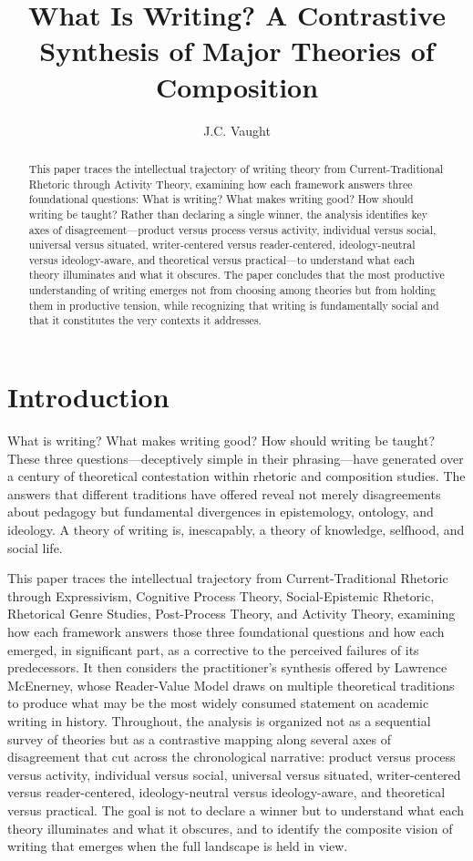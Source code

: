 \documentclass[12pt]{article}
\author{J.C. Vaught}
\title{What Is Writing? A Contrastive Synthesis of Major Theories of Composition}
\date{}
\begin{document}
\maketitle

\begin{abstract}
This paper traces the intellectual trajectory of writing theory from Current-Traditional Rhetoric through Activity Theory, examining how each framework answers three foundational questions: What is writing? What makes writing good? How should writing be taught? Rather than declaring a single winner, the analysis identifies key axes of disagreement---product versus process versus activity, individual versus social, universal versus situated, writer-centered versus reader-centered, ideology-neutral versus ideology-aware, and theoretical versus practical---to understand what each theory illuminates and what it obscures. The paper concludes that the most productive understanding of writing emerges not from choosing among theories but from holding them in productive tension, while recognizing that writing is fundamentally social and that it constitutes the very contexts it addresses.
\end{abstract}

\section{Introduction}

What is writing? What makes writing good? How should writing be taught? These three questions---deceptively simple in their phrasing---have generated over a century of theoretical contestation within rhetoric and composition studies. The answers that different traditions have offered reveal not merely disagreements about pedagogy but fundamental divergences in epistemology, ontology, and ideology. A theory of writing is, inescapably, a theory of knowledge, selfhood, and social life.

This paper traces the intellectual trajectory from Current-Traditional Rhetoric through Expressivism, Cognitive Process Theory, Social-Epistemic Rhetoric, Rhetorical Genre Studies, Post-Process Theory, and Activity Theory, examining how each framework answers those three foundational questions and how each emerged, in significant part, as a corrective to the perceived failures of its predecessors. It then considers the practitioner's synthesis offered by Lawrence McEnerney, whose Reader-Value Model draws on multiple theoretical traditions to produce what may be the most widely consumed statement on academic writing in history. Throughout, the analysis is organized not as a sequential survey of theories but as a contrastive mapping along several axes of disagreement that cut across the chronological narrative: product versus process versus activity, individual versus social, universal versus situated, writer-centered versus reader-centered, ideology-neutral versus ideology-aware, and theoretical versus practical. The goal is not to declare a winner but to understand what each theory illuminates and what it obscures, and to identify the composite vision of writing that emerges when the full landscape is held in view.
\end{document}
